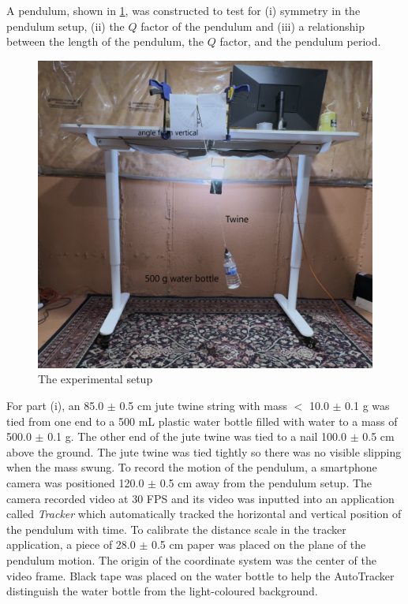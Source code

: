\documentclass[notitlepage, twocolumn, 12pt]{article}
\begin{document}
    A pendulum, shown in \cref{fig:setup}, was constructed to test for (i) symmetry in the pendulum setup, (ii) the $Q$ factor of the pendulum and (iii) a relationship between the length of the pendulum, the $Q$ factor, and the pendulum period.
    \begin{figure}[H]
        \includegraphics[width=\linewidth]{temp.png}
        \caption{The experimental setup}
        \label{fig:setup}
    \end{figure}
    For part (i), an 85.0 $\pm$ 0.5 cm jute twine string with mass $<$ 10.0 $\pm$ 0.1 g was tied from one end to a 500 mL plastic water bottle filled with water to a mass of 500.0 $\pm$ 0.1 g. The other end of the jute twine was tied to a nail 100.0 $\pm$ 0.5 cm above the ground. The jute twine was tied tightly so there was no visible slipping when the mass swung. To record the motion of the pendulum, a smartphone camera was positioned 120.0 $\pm$ 0.5 cm away from the pendulum setup. The camera recorded video at 30 FPS and its video was inputted into an application called \textit{Tracker} which automatically tracked the horizontal and vertical position of the pendulum with time. To calibrate the distance scale in the tracker application, a piece of 28.0 $\pm$ 0.5 cm paper was placed on the plane of the pendulum motion. The origin of the coordinate system was the center of the video frame. Black tape was placed on the water bottle to help the AutoTracker distinguish the water bottle from the light-coloured background. 
\end{document}
